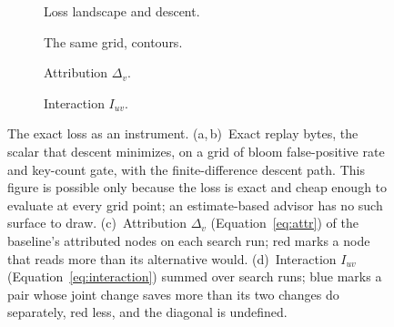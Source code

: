 \begin{figure}[t]
  \centering
  \begin{subfigure}[t]{0.27\textwidth}
    \centering
    
    \caption{Loss landscape and descent.}
    \label{fig:landscape}
  \end{subfigure}\hfill
  \begin{subfigure}[t]{0.235\textwidth}
    \centering
    
    \caption{The same grid, contours.}
    \label{fig:contour}
  \end{subfigure}\hfill
  \begin{subfigure}[t]{0.29\textwidth}
    \centering
    
    \caption{Attribution $\Delta_v$.}
    \label{fig:attribution}
  \end{subfigure}\hfill
  \begin{subfigure}[t]{0.165\textwidth}
    \centering
    
    \caption{Interaction $I_{uv}$.}
    \label{fig:interaction}
  \end{subfigure}
  \caption{The exact loss as an instrument. (a,\,b)~Exact replay bytes, the
    scalar that descent minimizes, on a grid of bloom false-positive rate and
    key-count gate, with the finite-difference descent path. This figure is
    possible only because the loss is exact and cheap enough to evaluate at
    every grid point; an estimate-based advisor has no such surface to draw.
    (c)~Attribution $\Delta_v$ (Equation~\eqref{eq:attr}) of the baseline's
    attributed nodes on each search run; red marks a node that reads more
    than its alternative would. (d)~Interaction $I_{uv}$
    (Equation~\eqref{eq:interaction}) summed over search runs; blue marks a
    pair whose joint change saves more than its two changes do separately,
    red less, and the diagonal is undefined.}
  \label{fig:results-loss}
\end{figure}

